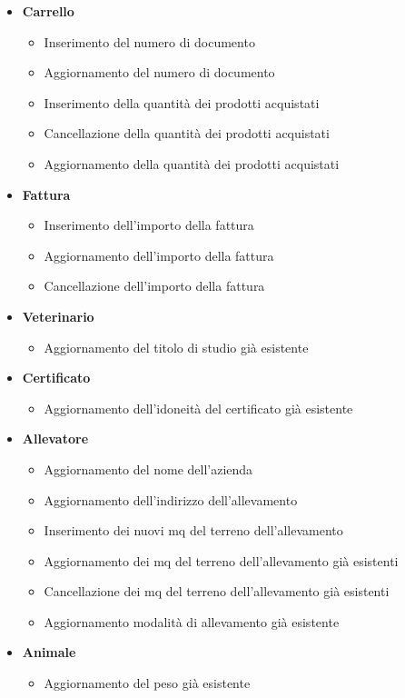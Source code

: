 \documentclass[12pt]{report}
\begin{document}
\begin{itemize}
\begin{itemize}
	\end{itemize}
\item \textbf{Carrello}
	\begin{itemize}
	\item Inserimento del numero di documento
	\item Aggiornamento del numero di documento
	\item Inserimento della quantità dei prodotti acquistati
	\item Cancellazione della quantità dei prodotti acquistati
	\item Aggiornamento della quantità dei prodotti acquistati
	\end{itemize}
\item \textbf{Fattura}
	\begin{itemize}
	\item Inserimento dell'importo della fattura
	\item Aggiornamento dell'importo della fattura
	\item Cancellazione dell'importo della fattura
	\end{itemize}
\item \textbf{Veterinario}
	\begin{itemize}
	\item Aggiornamento del titolo di studio già esistente
	\end{itemize}
	\item \textbf{Certificato}
	\begin{itemize}
	\item Aggiornamento dell'idoneità del certificato già esistente
	\end{itemize}
\item \textbf{Allevatore}
	\begin{itemize}
	\item Aggiornamento del nome dell'azienda
	\item Aggiornamento dell'indirizzo dell'allevamento
	\item Inserimento dei nuovi mq del terreno dell'allevamento
	\item Aggiornamento dei mq del terreno dell'allevamento già esistenti
	\item Cancellazione dei mq del terreno dell'allevamento già esistenti
	\item Aggiornamento modalità di allevamento già esistente

	\end{itemize}
\item \textbf{Animale}
	\begin{itemize}
	\item Aggiornamento del peso già esistente
	

\end{itemize}
\end{itemize}
\end{document}
